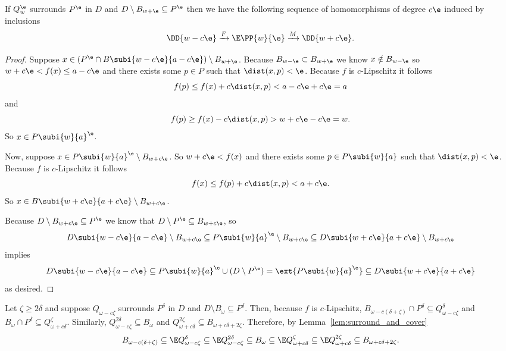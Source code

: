 \begin{lemma}\label{lem:p_interleave}
 If $Q_w^\e$ surrounds $P^\e$ in $D$ and $D\setminus B_{w + \e}\subseteq P^\e$ then we have the following sequence of homomorphisms of degree $c\e$ induced by inclusions
 \[\DD{w-c\e}\xrightarrow{F}\E\PP{w}{\e}\xrightarrow{M}\DD{w+c\e}.\]
\end{lemma}
\begin{proof}
  Suppose $x\in (P^\e\cap B\subi{w-c\e}{a-c\e})\setminus B_{w+\e}$.
  Because $B_{w-\e}\subset B_{w+\e}$ we know $x\notin B_{w-\e}$ so $w+c\e < f(x)\leq a-c\e$ and there exists some $p\in P$ such that $\dist(x, p) < \e$.
  Because $f$ is $c$-Lipschitz it follows
  \[ f(p)\leq f(x) + c\dist(x, p) < a - c\e + c\e = a\]
  and
  \[ f(p)\geq f(x) - c\dist(x, p) > w+c\e-c\e = w.\]
  So $x\in P\subi{w}{a}^\e$.

  Now, suppose $x\in P\subi{w}{a}^\e\setminus B_{w+c\e}$.
  So $w+c\e < f(x)$ and there exists some $p\in P\subi{w}{a}$ such that $\dist(x,p) < \e$.
  Because $f$ is $c$-Lipschitz it follows
  \[ f(x) \leq f(p) + c\dist(x,p) < a + c\e.\]
  So $x\in B\subi{w+c\e}{a+c\e}\setminus B_{w+c\e}$.

  Because $D\setminus B_{w+c\e}\subseteq P^\e$ we know that $D\setminus P^\e \subseteq B_{w+c\e}$, so
  \[D\subi{w-c\e}{a-c\e}\setminus B_{w+c\e} \subseteq P\subi{w}{a}^\e\setminus B_{w+c\e}\subseteq D\subi{w+c\e}{a+c\e}\setminus B_{w+c\e}\]
  implies
  \[ D\subi{w-c\e}{a-c\e}\subseteq P\subi{w}{a}^\e\cup (D\setminus P^\e) = \ext{P\subi{w}{a}^\e} \subseteq D\subi{w+c\e}{a+c\e} \]
  as desired.
\end{proof}

Let $\zeta\geq 2\delta$ and suppose $Q_{\omega-c\zeta}$ surrounds $P^\delta$ in $D$ and $D\setminus B_\omega\subseteq P^\delta$.
Then, because $f$ is $c$-Lipschitz, $B_{\omega-c(\delta+\zeta)}\cap P^\delta\subseteq Q_{\omega-c\zeta}^\delta$ and $B_\omega\cap P^\delta\subseteq Q_{\omega+c\delta}^\zeta$.
Similarly, $Q_{\omega-c\zeta}^{2\delta}\subseteq B_\omega$ and $Q_{\omega+c\delta}^{2\zeta}\subseteq B_{\omega+c{\delta+2\zeta}}$.
Therefore, by Lemma~\ref{lem:surround_and_cover}
\[ B_{\omega-c(\delta+\zeta)}\subseteq \E Q_{\omega-c\zeta}^\delta\subseteq\E Q_{\omega-c\zeta}^{2\delta}\subseteq B_\omega
  \subseteq \E Q_{\omega+c\delta}^\zeta\subseteq \E Q_{\omega+c\delta}^{2\zeta}\subseteq B_{\omega+c{\delta+2\zeta}}.\]

